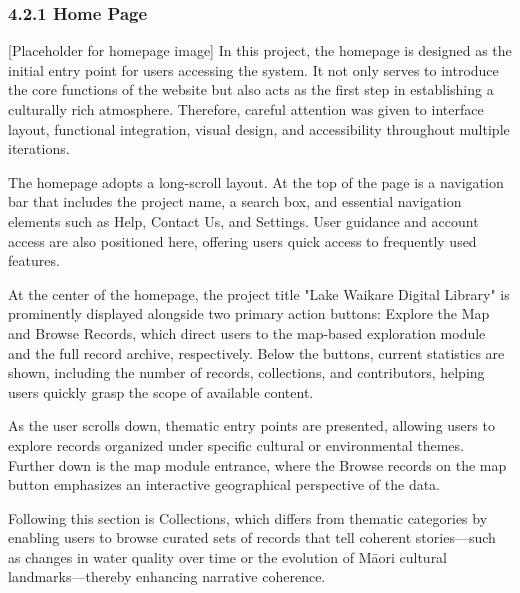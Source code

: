 ﻿%


\subsubsection*{4.2.1 Home Page}

[Placeholder for homepage image]
In this project, the homepage is designed as the initial entry point for users accessing the system. It not only serves to introduce the core functions of the website but also acts as the first step in establishing a culturally rich atmosphere. Therefore, careful attention was given to interface layout, functional integration, visual design, and accessibility throughout multiple iterations.

The homepage adopts a long-scroll layout. At the top of the page is a navigation bar that includes the project name, a search box, and essential navigation elements such as Help, Contact Us, and Settings. User guidance and account access are also positioned here, offering users quick access to frequently used features.

At the center of the homepage, the project title "Lake Waikare Digital Library" is prominently displayed alongside two primary action buttons: Explore the Map and Browse Records, which direct users to the map-based exploration module and the full record archive, respectively. Below the buttons, current statistics are shown, including the number of records, collections, and contributors, helping users quickly grasp the scope of available content.

As the user scrolls down, thematic entry points are presented, allowing users to explore records organized under specific cultural or environmental themes. Further down is the map module entrance, where the Browse records on the map button emphasizes an interactive geographical perspective of the data.

Following this section is Collections, which differs from thematic categories by enabling users to browse curated sets of records that tell coherent stories—such as changes in water quality over time or the evolution of Māori cultural landmarks—thereby enhancing narrative coherence.

